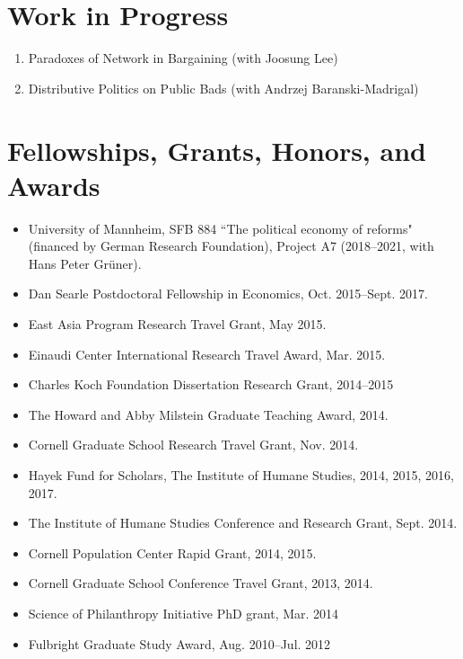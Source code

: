 \documentclass[margin, letterpaper]{res}
\begin{document}
\begin{resume}
\section{Work in Progress}
\begin{enumerate}
\item Paradoxes of Network in Bargaining (with Joosung Lee)
\item Distributive Politics on Public Bads (with Andrzej Baranski-Madrigal)
\end{enumerate}

\section{Fellowships, Grants, Honors, and Awards}
\begin{itemize}
\item University of Mannheim, SFB 884 ``The political economy of reforms" (financed by German Research Foundation), Project A7 (2018--2021, with Hans Peter Gr{\"u}ner).
\item Dan Searle Postdoctoral Fellowship in Economics, Oct. 2015--Sept. 2017.
\item East Asia Program Research Travel Grant, May 2015.
\item Einaudi Center International Research Travel Award, Mar. 2015.
\item Charles Koch Foundation Dissertation Research Grant, 2014--2015
\item The Howard and Abby Milstein Graduate Teaching Award, 2014.
\item Cornell Graduate School Research Travel Grant, Nov. 2014.
\item Hayek Fund for Scholars, The Institute of Humane Studies, 2014, 2015, 2016, 2017.
\item The Institute of Humane Studies Conference and Research Grant, Sept. 2014.
\item Cornell Population Center Rapid Grant, 2014, 2015.
\item Cornell Graduate School Conference Travel Grant, 2013, 2014.
\item Science of Philanthropy Initiative PhD grant, Mar. 2014
\item Fulbright Graduate Study Award, Aug. 2010--Jul. 2012
\end{itemize}


\end{resume}
\end{document}
